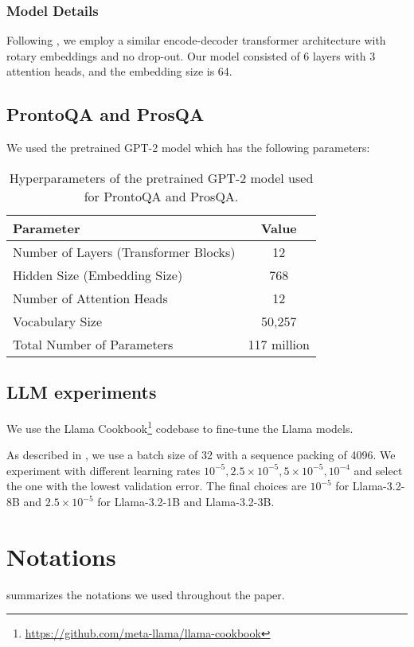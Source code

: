 \subsubsection{Model Details}
Following \citet{su2024dualformer, lehnert2024beyond}, we employ a similar encode-decoder transformer architecture with rotary embeddings and no drop-out. Our model consisted of 6 layers with 3 attention heads, and the embedding size is 64. 

\subsection{ProntoQA and ProsQA}
We used the pretrained GPT-2 model which has the following parameters:

\begin{table}[H]
    \centering
    \begin{tabular}{lc}
        \toprule
        \textbf{Parameter} & \textbf{Value} \\ 
        \midrule
        Number of Layers (Transformer Blocks) & 12 \\ 
        Hidden Size (Embedding Size) & 768 \\ 
        Number of Attention Heads & 12 \\ 
        Vocabulary Size & 50,257 \\ 
        Total Number of Parameters & 117 million \\ 
        \bottomrule
    \end{tabular}
    \caption{Hyperparameters of the pretrained GPT-2 model used for ProntoQA and ProsQA.}
\end{table}



\subsection{LLM experiments}
We use the Llama Cookbook\footnote{\url{https://github.com/meta-llama/llama-cookbook}} codebase to fine-tune the Llama models.


As described in , we use a batch size of 32 with a sequence packing of 4096. We experiment with different learning rates $10^{-5}, 2.5 \times 10^{-5}, 5 \times 10^{-5}, 10^{-4}$ and select the one with the lowest validation error. The final choices are $10^{-5}$ for Llama-3.2-8B and $2.5 \times 10^{-5}$ for Llama-3.2-1B and Llama-3.2-3B.


\section{Notations}
\label{app:notations}
 summarizes the notations we used throughout the paper.

